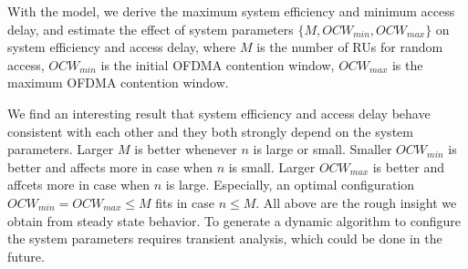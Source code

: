 \documentclass[journal]{IEEEtran}
\begin{document}
With the model, we derive the maximum system efficiency and minimum access delay, and estimate the effect of system parameters $\lbrace M, OCW_{min}, OCW_{max} \rbrace$ on system efficiency and access delay, where $M$ is the number of RUs for random access, $OCW_{min}$ is the initial OFDMA contention window, $OCW_{max}$ is the maximum OFDMA contention window. 

We find an interesting result that system efficiency and access delay behave consistent with each other and they both strongly depend on the system parameters.
Larger $M$ is better whenever $n$ is large or small.
Smaller $OCW_{min}$ is better and affects more in case when $n$ is small.
Larger $OCW_{max}$ is better and affcets more in case when $n$ is large. 
Especially, an optimal configuration $OCW_{min}=OCW_{max}\leq M$ fits in case $n\leq M$. 
All above are the rough insight we obtain from steady state behavior.
To generate a dynamic algorithm to configure the system parameters requires transient analysis, which could be done in the future.

%
%
\end{document}
